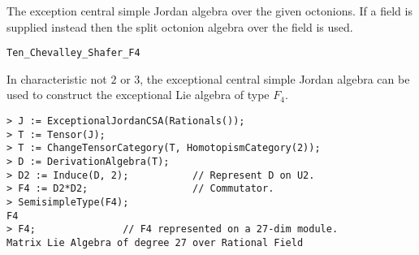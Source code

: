 The exception central simple Jordan algebra over the given octonions.
If a field is supplied instead then the split octonion algebra over the
field is used.


\medskip
\begin{framed}
 {\tt Ten\_Chevalley\_Shafer\_F4}\\
{\small
In characteristic not $2$ or $3$, the exceptional central 
simple Jordan algebra can be used to construct
the exceptional Lie algebra of type $F_4$.
\begin{lstlisting}[frame=single,basicstyle=\ttfamily\color{black!30!
teal},backgroundcolor=\color{white!70!gray}]
> J := ExceptionalJordanCSA(Rationals());
> T := Tensor(J);                                     
> T := ChangeTensorCategory(T, HomotopismCategory(2));
> D := DerivationAlgebra(T);
> D2 := Induce(D, 2);           // Represent D on U2.
> F4 := D2*D2;                  // Commutator.
> SemisimpleType(F4);
F4
> F4;               // F4 represented on a 27-dim module.
Matrix Lie Algebra of degree 27 over Rational Field
\end{lstlisting}
}
\end{framed}
